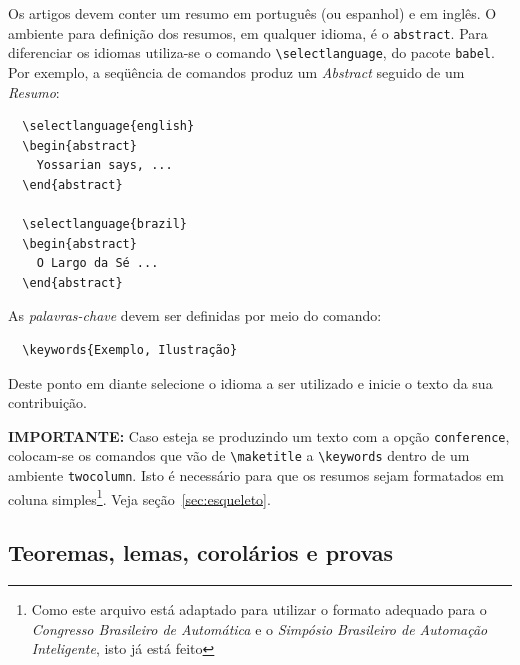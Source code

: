 \documentclass[conference,harvard,brazil,english]{sbatex}
\begin{document}
Os artigos devem conter um resumo em português (ou espanhol) e em
inglês. O ambiente para definição dos resumos, em qualquer idioma, é o
\verb+abstract+. Para diferenciar os idiomas utiliza-se o comando
\verb+\selectlanguage+, do pacote \verb+babel+. Por exemplo, a seqüência
de comandos produz um \emph{Abstract} seguido de um \emph{Resumo}:
\begin{verbatim}
  \selectlanguage{english}
  \begin{abstract}
    Yossarian says, ...
  \end{abstract}

  \selectlanguage{brazil}
  \begin{abstract}
    O Largo da Sé ...
  \end{abstract}
\end{verbatim}

As \emph{palavras-chave} devem ser definidas por meio do comando:
\begin{verbatim}
  \keywords{Exemplo, Ilustração}
\end{verbatim}

Deste ponto em diante selecione o idioma a ser utilizado e
inicie o texto da sua contribuição.

\textbf{IMPORTANTE:} Caso esteja se produzindo um texto com a
opção \verb+conference+, colocam-se os comandos que vão de
\verb+\maketitle+ a \verb+\keywords+ dentro de um ambiente
\verb+twocolumn+. Isto é necessário para que os resumos sejam
formatados em coluna simples\footnote{Como este arquivo está
adaptado para utilizar o formato adequado para o \emph{Congresso
Brasileiro de Automática} e o \emph{Simpósio Brasileiro de
Automação Inteligente}, isto já está feito}. Veja
seção~\ref{sec:esqueleto}.


\subsection{Teoremas, lemas, corolários e provas}
\end{document}
